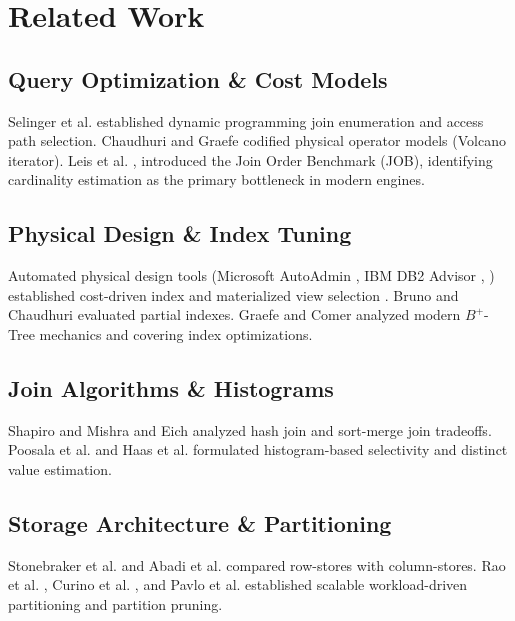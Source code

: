 \documentclass[journal]{IEEEtran}
\begin{document}
\section{Related Work}
\subsection{Query Optimization \& Cost Models}
Selinger et al. \cite{selinger1979access} established dynamic programming join enumeration and access path selection. Chaudhuri \cite{chaudhuri1998overview} and Graefe \cite{graefe1993query} codified physical operator models (Volcano iterator). Leis et al. \cite{leis2015good}, \cite{leis2018query} introduced the Join Order Benchmark (JOB), identifying cardinality estimation as the primary bottleneck in modern engines.

\subsection{Physical Design \& Index Tuning}
Automated physical design tools (Microsoft AutoAdmin \cite{chaudhuri1997efficient}, IBM DB2 Advisor \cite{valentin2000db2}, \cite{zilio2004db2}) established cost-driven index and materialized view selection \cite{agrawal2000automated}. Bruno and Chaudhuri \cite{bruno2002exploiting} evaluated partial indexes. Graefe \cite{graefe2011modern} and Comer \cite{comer1979ubiquitous} analyzed modern $B^+$-Tree mechanics and covering index optimizations.

\subsection{Join Algorithms \& Histograms}
Shapiro \cite{shapiro1986join} and Mishra and Eich \cite{mishra1992join} analyzed hash join and sort-merge join tradeoffs. Poosala et al. \cite{poosala1996improved} and Haas et al. \cite{haas1995sampling} formulated histogram-based selectivity and distinct value estimation.

\subsection{Storage Architecture \& Partitioning}
Stonebraker et al. \cite{stonebraker2005cstore} and Abadi et al. \cite{abadi2008column} compared row-stores with column-stores. Rao et al. \cite{rao2012scalable}, Curino et al. \cite{curino2010schism}, and Pavlo et al. \cite{pavlo2012skew} established scalable workload-driven partitioning and partition pruning.
\end{document}
